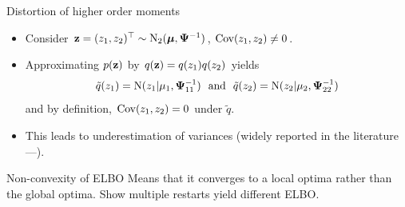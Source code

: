 \begin{frame}{Distortion of higher order moments}
  \vspace{-11pt}
  \begin{figure}[t]
    \centering\hspace{-16pt}
  \end{figure}
  \vspace{-10pt}
  \begin{itemize}[<+->]
    \item Consider ${\mathbf z} = (z_{1}, z_{2})^\top \sim \operatorname{N}_2( {\bm\mu}, {\bm\Psi}^{-1})$, $\operatorname{Cov}(z_1,z_2) \neq 0$.
    \item Approximating $p({\mathbf z})$ by $q({\mathbf z}) = q(z_1)q(z_2)$ yields
    \[
      \tilde q(z_1) = \N(z_1|\mu_1,\bPsi_{11}^{-1}) \ \text{ and } \ \tilde q(z_2) = \N(z_2|\mu_2,\bPsi_{22}^{-1})
    \]
    and by definition, $\operatorname{Cov}(z_1,z_2) = 0$ under $\tilde q$.
    \item This leads to underestimation of variances (widely reported in the literature---\cite{zhao2013}).
  \end{itemize}
\end{frame}

\begin{frame}{Non-convexity of ELBO}
  Means that it converges to a local optima rather than the global optima. Show multiple restarts yield different ELBO.
\end{frame}

